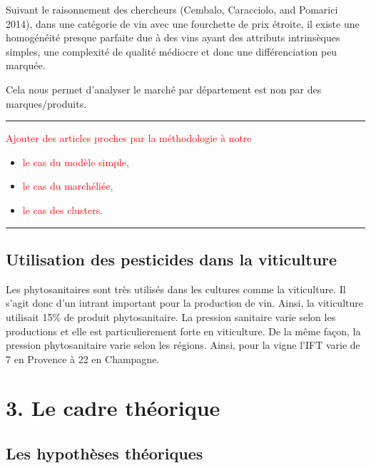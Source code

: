 \documentclass[11pt,]{article}
\providecommand{\tightlist}{%
  \setlength{\itemsep}{0pt}\setlength{\parskip}{0pt}}
\begin{document}
Suivant le raisonnement des chercheurs (Cembalo, Caracciolo, and
Pomarici 2014), dans une catégorie de vin avec une fourchette de prix
étroite, il existe une homogénéité presque parfaite due à des vins ayant
des attributs intrinsèques simples, une complexité de qualité médiocre
et donc une différenciation peu marquée.

Cela nous permet d'analyser le marché par département est non par des
marques/produits.

\noindent

\rule[0.5ex]{\linewidth}{1pt}

\textcolor{red}{Ajouter des articles proches par la méthodologie à notre }

\begin{itemize}
\tightlist
\item
  \textcolor{red}{le cas du modèle simple,  }
\item
  \textcolor{red}{le cas du marchéliée, }
\item
  \textcolor{red}{le cas des clusters.}
\end{itemize}

\noindent

\rule[0.5ex]{\linewidth}{1pt}

\hypertarget{utilisation-des-pesticides-dans-la-viticulture}{%
\subsection{Utilisation des pesticides dans la
viticulture}\label{utilisation-des-pesticides-dans-la-viticulture}}

Les phytosanitaires sont très utilisés dans les cultures comme la
viticulture. Il s'agit donc d'un intrant important pour la production de
vin. Ainsi, la viticulture utilisait 15\% de produit phytosanitaire. La
pression sanitaire varie selon les productions et elle est
particulierement forte en viticulture. De la même façon, la pression
phytosanitaire varie selon les régions. Ainsi, pour la vigne l'IFT varie
de 7 en Provence à 22 en Champagne.

\hypertarget{le-cadre-theorique}{%
\section{3. Le cadre théorique}\label{le-cadre-theorique}}

\hypertarget{les-hypotheses-theoriques}{%
\subsection{Les hypothèses théoriques}\label{les-hypotheses-theoriques}}
\end{document}
